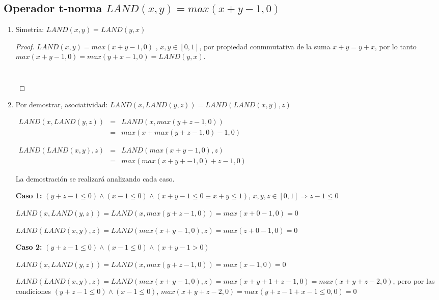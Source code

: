 \documentclass[letterpaper,spanish,11pt]{article}
\begin{document}
\subsection{Operador t-norma $LAND(x,y)=max(x+y-1,0)$}

\begin{enumerate}
\item Simetr\'{i}a: $LAND(x,y)=LAND(y,x)$

\begin{proof}

$LAND(x,y)=max(x+y-1,0)$ , $x,y \in [0,1]$, por propiedad conmmutativa de la suma $x+y=y+x$, por lo tanto $max(x+y-1,0)=max(y+x-1,0) = LAND(y,x)$.

\[\qedhere\]
\end{proof}

\item Por demostrar, asociatividad:  $LAND(x,LAND(y,z))=LAND(LAND(x,y),z)$

$\begin{array} {lcl} LAND(x,LAND(y,z)) & = & LAND(x,max(y+z-1,0)) \\ 
& = & max(x + max(y+z-1,0)-1,0) \end{array}$


$\begin{array} {lcl} LAND(LAND(x,y),z) & = & LAND(max(x+y-1,0),z) \\ 
& = & max(max(x+y+-1,0)+z-1,0) \end{array}$


La demostraci\'{o}n se realizar\'{a} analizando cada caso.

\textbf{Caso 1:} $(y+z-1 \leq 0) \wedge (x-1 \leq 0) \wedge  (x+y-1 \leq 0 \equiv x+y \leq 1) $, $x,y,z \in [0,1] \Rightarrow z-1 \leq 0$

$LAND(x,LAND(y,z))=LAND(x,max(y+z-1,0))= max(x + 0 -1 ,0)= 0$

$LAND(LAND(x,y),z)=LAND(max(x+y-1,0),z) = max(z + 0 -1,0)=0$





\textbf{Caso 2:} $(y+z-1 \leq 0) \wedge (x-1 \leq 0) \wedge (x+y-1 > 0) $ 

$LAND(x,LAND(y,z))=    LAND(x,max(y+z-1,0)) = max(x-1,0) =0$

$LAND(LAND(x,y),z)=  LAND(max(x+y-1,0),z) = max(x+y+1 +z -1,0)=max(x+y+z-2,0)$, pero por las condiciones $(y+z-1 \leq 0) \wedge (x-1 \leq 0)$, $max(x+y+z-2,0)=max(y+z-1+x-1 \leq 0, 0) = 0$



\end{enumerate}
\end{document}
